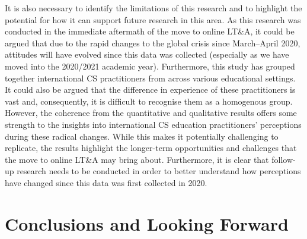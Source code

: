 \documentclass[conference]{IEEEtran}
\begin{document}
It is also necessary to identify the limitations of this research and
to highlight the potential for how it can support future research in
this area. As this research was conducted in the immediate aftermath
of the move to online LT\&A, it could be argued that due to the rapid
changes to the global crisis since March--April 2020, attitudes will
have evolved since this data was collected (especially as we have
moved into the 2020/2021 academic year). Furthermore, this study has
grouped together international CS practitioners from across various
educational settings. It could also be argued that the difference in
experience of these practitioners is vast and, consequently, it is
difficult to recognise them as a homogenous group. However, the
coherence from the quantitative and qualitative results offers some
strength to the insights into international CS education
practitioners' perceptions during these radical changes. While this
makes it potentially challenging to replicate, the results highlight
the longer-term opportunities and challenges that the move to online
LT\&A may bring about. Furthermore, it is clear that follow-up
research needs to be conducted in order to better understand how
perceptions have changed since this data was first collected in 2020.


\section{Conclusions and Looking Forward}\label{conclusions}
\end{document}
